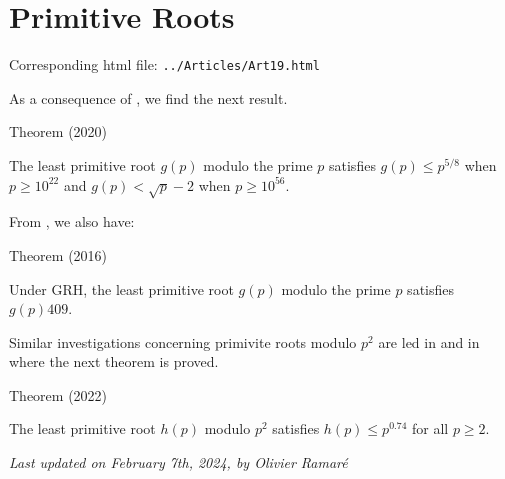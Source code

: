 \chapter{  Primitive Roots}

Corresponding html file: \texttt{../Articles/Art19.html}










 
 


As a  consequence of
\cite{McGown-Trudgian*20},
we find the next result.
\par 
\begin{thm}{Theorem (2020)}

    The least primitive root $g(p)$ modulo the prime $p$ satisfies
    $g(p)\le p^{5/8}$ when $p\ge 10^{22}$ and $g(p) < \sqrt{p}-2$ when
    $p\ge 10^{56}$.
\end{thm}

From
\cite{McGown-Trevino-Trudgian*16},
we also have:
\par 
\begin{thm}{Theorem (2016)}

    Under GRH, the least primitive root $g(p)$ modulo the prime $p$ satisfies
    $g(p)  409$.
\end{thm}


Similar investigations concerning primivite roots modulo $p^2$ are led
in
\cite{Kerr-McGown-Trudgian*20}
and in
\cite{Chen*22}
where the next theorem is proved.
\par 
\begin{thm}{Theorem (2022)}

    The least primitive root $h(p)$ modulo $p^2$ satisfies
    $h(p)\le p^{0.74}$ for all $p \ge 2$.
\end{thm}







  
\begin{flushright}\small\sl{}   Last updated on February 7th, 2024, by Olivier Ramar\'e
 \end{flushright}














